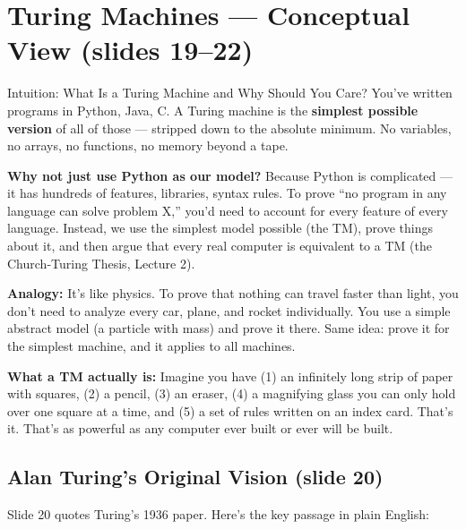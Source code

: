 \documentclass[11pt,a4paper]{article}
\begin{document}
\newpage
\section{Turing Machines --- Conceptual View (slides 19--22)}

\begin{conceptbox}{Intuition: What Is a Turing Machine and Why Should You Care?}
You've written programs in Python, Java, C. A Turing machine is the \textbf{simplest possible version} of all of those --- stripped down to the absolute minimum. No variables, no arrays, no functions, no memory beyond a tape.

\textbf{Why not just use Python as our model?} Because Python is complicated --- it has hundreds of features, libraries, syntax rules. To prove ``no program in any language can solve problem X,'' you'd need to account for every feature of every language. Instead, we use the simplest model possible (the TM), prove things about it, and then argue that every real computer is equivalent to a TM (the Church-Turing Thesis, Lecture 2).

\textbf{Analogy:} It's like physics. To prove that nothing can travel faster than light, you don't need to analyze every car, plane, and rocket individually. You use a simple abstract model (a particle with mass) and prove it there. Same idea: prove it for the simplest machine, and it applies to all machines.

\textbf{What a TM actually is:} Imagine you have (1) an infinitely long strip of paper with squares, (2) a pencil, (3) an eraser, (4) a magnifying glass you can only hold over one square at a time, and (5) a set of rules written on an index card. That's it. That's as powerful as any computer ever built or ever will be built.
\end{conceptbox}

\subsection{Alan Turing's Original Vision (slide 20)}

Slide 20 quotes Turing's 1936 paper. Here's the key passage in plain English:
\end{document}
